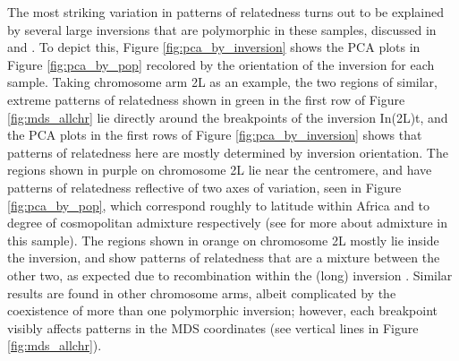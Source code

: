 \documentclass[11pt, oneside]{article}   	%
\newcommand{\plr}[1]{{\em \color{blue} #1}}
\begin{document}


The most striking variation in patterns of relatedness turns out to be explained by
several large inversions that are polymorphic in these samples, 
discussed in \citet{corbett2012population} and \citet{langley2012genomic}.
To depict this, Figure \ref{fig:pca_by_inversion} shows
the PCA plots in Figure \ref{fig:pca_by_pop} recolored by the orientation of the inversion for each sample.
Taking chromosome arm 2L as an example,
the two regions of similar, extreme patterns of relatedness
shown in green in the first row of Figure \ref{fig:mds_allchr}
lie directly around the breakpoints of the inversion In(2L)t,
and the PCA plots in the first rows of Figure \ref{fig:pca_by_inversion}
shows that patterns of relatedness here are mostly determined by inversion orientation.
The regions shown in purple on chromosome 2L lie near the centromere,
and have patterns of relatedness reflective of two axes of variation,
seen in Figure \ref{fig:pca_by_pop},
which correspond roughly to latitude within Africa and to degree of cosmopolitan admixture respectively
(see \citet{lack2015drosophila} for more about admixture in this sample).
The regions shown in orange on chromosome 2L mostly lie inside the inversion,
and show patterns of relatedness that are a mixture between the other two,
as expected due to recombination within the (long) inversion \citep{guerrero2011coalescent}.
Similar results are found in other chromosome arms,
albeit complicated by the coexistence of more than one polymorphic inversion;
however, each breakpoint visibly affects patterns in the MDS coordinates
(see vertical lines in Figure \ref{fig:mds_allchr}).
\end{document}
